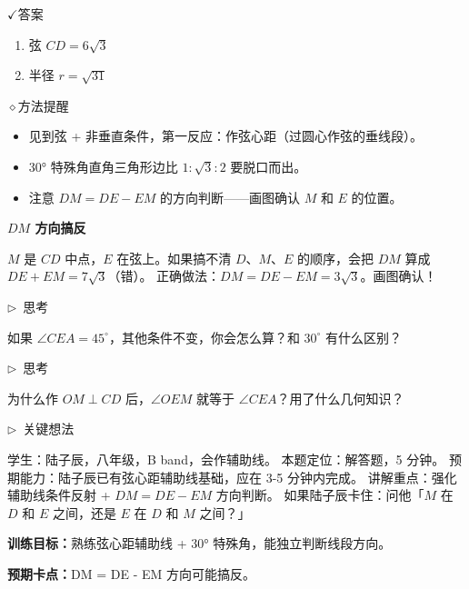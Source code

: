 \documentclass{exam-zh}
\newcommand{\edukai}{\kaishu}
\newcommand{\eduSubTitle}[1]{%
  \needspace{4\baselineskip}%
  \vspace{1mm}
  {\color{edu-blue}\bfseries #1}\par
  \vspace{1mm}
}
\newenvironment{eduAuxItem}[1]{%
  \needspace{4\baselineskip}%
  \vspace{2mm}
  \par\noindent
  \hangindent=8mm\hangafter=1
  {\color{edu-blue}\edukai $\triangleright$~#1}\enspace
  \begingroup
  \color{edu-ink}
  \edukai
}{%
  \endgroup
  \par
  \vspace{4mm}
}
\newcommand{\eduIconCheck}{\(\checkmark\)}
\newcommand{\eduIconPin}{\(\diamond\)}
\newenvironment{eduBulletList}{%
  \begin{itemize}[
    label=\textbullet,
    leftmargin=5mm,
    itemsep=1.2mm,
    topsep=0pt,
    parsep=0pt
  ]
}{%
  \end{itemize}
}
\newenvironment{eduBottomGrid}{%
  \vspace{1mm}
  \par\noindent
}{%
  \par\vspace{1mm}
}
\newenvironment{eduSummaryLeft}{%
  \begin{minipage}[t]{0.30\linewidth}
}{%
  \end{minipage}
}
\newcommand{\eduSummaryDivider}{%
  \hspace{4mm}{\color{edu-line}\vrule width 0.35pt}\hspace{7mm}%
}
\newenvironment{eduSummaryRight}{%
  \begin{minipage}[t]{0.58\linewidth}
}{%
  \end{minipage}
}
\newenvironment{eduPlainList}{%
  \begin{enumerate}[
    label=(\arabic*),
    leftmargin=7mm,
    itemsep=1.2mm,
    topsep=0pt,
    parsep=0pt
  ]
}{%
  \end{enumerate}
}
\begin{document}
\begin{eduBottomGrid}
  \begin{eduSummaryLeft}
    \begin{eduSummaryBlock}{\eduIconCheck}{答案}
    \begin{eduPlainList}
      \item 弦 $CD = 6\sqrt{3}$      \item 半径 $r = \sqrt{31}$    \end{eduPlainList}
    \end{eduSummaryBlock}
  \end{eduSummaryLeft}
  \eduSummaryDivider
  \begin{eduSummaryRight}
    \begin{eduSummaryBlock}{\eduIconPin}{方法提醒}
    \begin{eduBulletList}
      \item 见到弦 + 非垂直条件，第一反应：作弦心距（过圆心作弦的垂线段）。      \item 30° 特殊角直角三角形边比 $1:\sqrt{3}:2$ 要脱口而出。      \item 注意 $DM = DE - EM$ 的方向判断——画图确认 $M$ 和 $E$ 的位置。    \end{eduBulletList}
    \end{eduSummaryBlock}
  \end{eduSummaryRight}
\end{eduBottomGrid}




\begin{eduMistakeBox}
\eduSubTitle{$DM$ 方向搞反}$M$ 是 $CD$ 中点，$E$ 在弦上。如果搞不清 $D$、$M$、$E$ 的顺序，会把 $DM$ 算成 $DE + EM = 7\sqrt{3}$（错）。
正确做法：$DM = DE - EM = 3\sqrt{3}$。画图确认！
\end{eduMistakeBox}




\begin{eduAuxItem}{思考}
如果 $\angle CEA = 45^\circ$，其他条件不变，你会怎么算？和 $30^\circ$ 有什么区别？\end{eduAuxItem}




\begin{eduAuxItem}{思考}
为什么作 $OM \perp CD$ 后，$\angle OEM$ 就等于 $\angle CEA$？用了什么几何知识？\end{eduAuxItem}



\clearpage

\begin{eduAuxItem}{关键想法}
学生：陆子辰，八年级，B band，会作辅助线。
本题定位：解答题，5 分钟。
预期能力：陆子辰已有弦心距辅助线基础，应在 3-5 分钟内完成。
讲解重点：强化辅助线条件反射 + $DM = DE - EM$ 方向判断。
如果陆子辰卡住：问他「$M$ 在 $D$ 和 $E$ 之间，还是 $E$ 在 $D$ 和 $M$ 之间？」
\end{eduAuxItem}


\begin{eduTeacherNote}
  \textbf{训练目标：}熟练弦心距辅助线 + 30° 特殊角，能独立判断线段方向。\par
  \textbf{预期卡点：}DM = DE - EM 方向可能搞反。
\end{eduTeacherNote}
\end{document}

